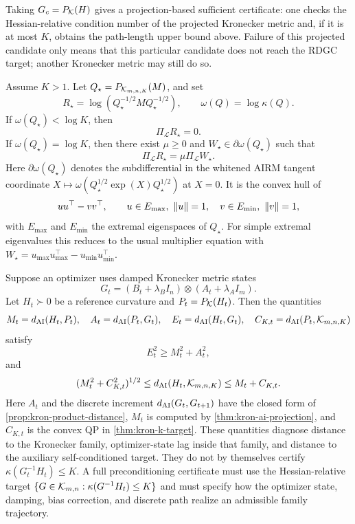 Taking \(G_c=P_{\mathcal K}(H)\) gives a projection-based sufficient certificate:
one checks the Hessian-relative condition number of the projected Kronecker
metric and, if it is at most \(K\), obtains the path-length upper bound above.
Failure of this projected candidate only means that this particular candidate
does not reach the RDGC target; another Kronecker metric may still do so.

\begin{proposition}
\label{prop:kron-kkt}
Assume \(K>1\). Let \(Q_\star=P_{\mathcal K_{m,n,K}}(M)\), and set
\[
  R_\star=\log(Q_\star^{-1/2}MQ_\star^{-1/2}),\qquad
  \omega(Q)=\log\kappa(Q).
\]
If \(\omega(Q_\star)<\log K\), then
\[
  \Pi_{\mathcal L}R_\star=0.
\]
If \(\omega(Q_\star)=\log K\), then there exist \(\mu\ge0\) and
\(W_\star\in\partial\omega(Q_\star)\) such that
\[
  \Pi_{\mathcal L}R_\star=\mu\Pi_{\mathcal L}W_\star.
\]
Here \(\partial\omega(Q_\star)\) denotes the subdifferential in the whitened
AIRM tangent coordinate
\(X\mapsto\omega(Q_\star^{1/2}\exp(X)Q_\star^{1/2})\) at \(X=0\).  It is the
convex hull of
\[
  uu^\top-vv^\top,\qquad
  u\in E_{\max},\ \left\lVert u\right\rVert=1,\quad
  v\in E_{\min},\ \left\lVert v\right\rVert=1,
\]
with \(E_{\max}\) and \(E_{\min}\) the extremal eigenspaces of \(Q_\star\).
For simple extremal eigenvalues this reduces to the usual multiplier equation
with \(W_\star=u_{\max}u_{\max}^\top-u_{\min}u_{\min}^\top\).
\end{proposition}

\begin{proposition}
\label{prop:kfac-certificates}
Suppose an optimizer uses damped Kronecker metric states
\[
  G_t=(B_t+\lambda_BI_n)\otimes(A_t+\lambda_AI_m).
\]
Let \(H_t\succ0\) be a reference curvature and
\(P_t=P_{\mathcal K}(H_t)\). Then the quantities
\[
  M_t=d_{\mathrm{AI}}(H_t,P_t),\quad
  A_t=d_{\mathrm{AI}}(P_t,G_t),\quad
  E_t=d_{\mathrm{AI}}(H_t,G_t),\quad
  C_{K,t}=d_{\mathrm{AI}}(P_t,\mathcal K_{m,n,K})
\]
satisfy
\[
  E_t^2\ge M_t^2+A_t^2,
\]
and
\[
  (M_t^2+C_{K,t}^2)^{1/2}
  \le
  d_{\mathrm{AI}}(H_t,\mathcal K_{m,n,K})
  \le
  M_t+C_{K,t}.
\]
Here \(A_t\) and the discrete increment \(d_{\mathrm{AI}}(G_t,G_{t+1})\) have the
closed form of \cref{prop:kron-product-distance}, \(M_t\) is computed by
\cref{thm:kron-ai-projection}, and \(C_{K,t}\) is the convex QP in
\cref{thm:kron-k-target}.
These quantities diagnose distance to the Kronecker family, optimizer-state
lag inside that family, and distance to the auxiliary self-conditioned target.
They do not by themselves certify \(\kappa(G_t^{-1}H_t)\le K\). A full
preconditioning certificate must use the Hessian-relative target
\(\{G\in\mathcal K_{m,n}:\kappa(G^{-1}H_t)\le K\}\) and must specify how the
optimizer state, damping, bias correction, and discrete path realize an
admissible family trajectory.
\end{proposition}

